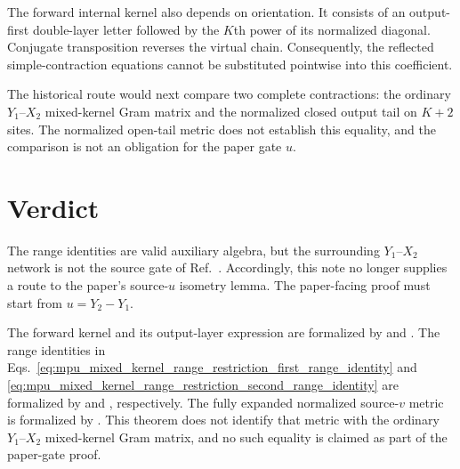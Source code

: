 \documentclass{article}
\begin{document}
The forward internal kernel also depends on orientation. It consists of an
output-first double-layer letter followed by the $K$th power of its normalized
diagonal. Conjugate transposition reverses the virtual chain. Consequently, the
reflected simple-contraction equations cannot be substituted pointwise into
this coefficient.

The historical route would next compare two complete contractions: the
ordinary $Y_1$--$X_2$ mixed-kernel Gram matrix and the normalized closed output
tail on $K+2$ sites. The normalized open-tail metric does not establish this
equality, and the comparison is not an obligation for the paper gate $u$.

\section{Verdict}

The range identities are valid auxiliary algebra, but the surrounding
$Y_1$--$X_2$ network is not the source gate of Ref.~\cite{Cirac2017MPU}.
Accordingly, this note no longer supplies a route to the paper's source-$u$
isometry lemma. The paper-facing proof must start from $u=Y_2\mathbin{-}Y_1$.

The forward kernel and its output-layer expression are formalized by
 and
.
The range identities in
Eqs.~\ref{eq:mpu_mixed_kernel_range_restriction_first_range_identity} and
\ref{eq:mpu_mixed_kernel_range_restriction_second_range_identity} are formalized by
 and
, respectively.
The fully expanded normalized source-$v$ metric is formalized by
. This theorem does
not identify that metric with the ordinary $Y_1$--$X_2$ mixed-kernel Gram
matrix, and no such equality is claimed as part of the paper-gate proof.



\end{document}
